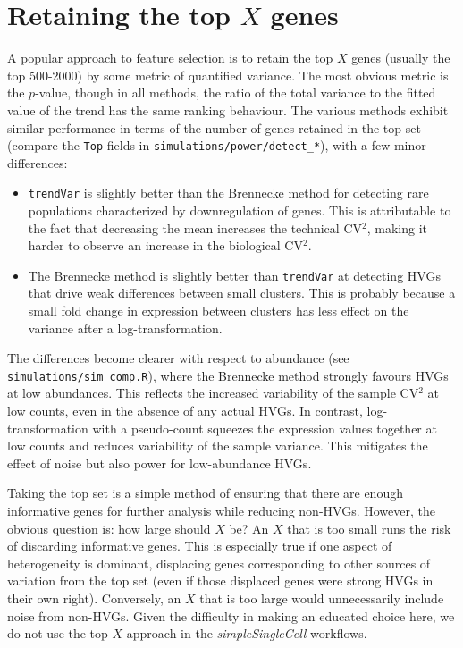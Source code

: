 \documentclass{article}
\newcommand\code[1]{{\small\texttt{#1}}}
\begin{document}
\section{Retaining the top $X$ genes}
A popular approach to feature selection is to retain the top $X$ genes (usually the top 500-2000) by some metric of quantified variance.
The most obvious metric is the $p$-value, though in all methods, the ratio of the total variance to the fitted value of the trend has the same ranking behaviour.
The various methods exhibit similar performance in terms of the number of genes retained in the top set
(compare the \code{Top} fields in \texttt{simulations/power/detect\_*}), with a few minor differences:
\begin{itemize}
\item \code{trendVar} is slightly better than the Brennecke method for detecting rare populations characterized by downregulation of genes.
This is attributable to the fact that decreasing the mean increases the technical CV$^2$, making it harder to observe an increase in the biological CV$^2$.
\item The Brennecke method is slightly better than \code{trendVar} at detecting HVGs that drive weak differences between small clusters.
This is probably because a small fold change in expression between clusters has less effect on the variance after a log-transformation.
\end{itemize}
The differences become clearer with respect to abundance (see \texttt{simulations/sim\_comp.R}), where the Brennecke method strongly favours HVGs at low abundances.
This reflects the increased variability of the sample CV$^2$ at low counts, even in the absence of any actual HVGs.
In contrast, log-transformation with a pseudo-count squeezes the expression values together at low counts and reduces variability of the sample variance.
This mitigates the effect of noise but also power for low-abundance HVGs.

Taking the top set is a simple method of ensuring that there are enough informative genes for further analysis while reducing non-HVGs.
However, the obvious question is: how large should $X$ be?
An $X$ that is too small runs the risk of discarding informative genes.
This is especially true if one aspect of heterogeneity is dominant, displacing genes corresponding to other sources of variation from the top set
(even if those displaced genes were strong HVGs in their own right).
Conversely, an $X$ that is too large would unnecessarily include noise from non-HVGs.
Given the difficulty in making an educated choice here, we do not use the top $X$ approach in the \textit{simpleSingleCell} workflows.
\end{document}
